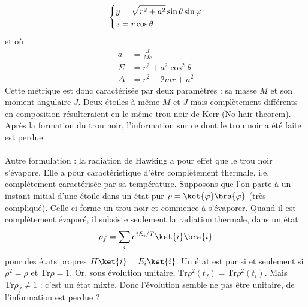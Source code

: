 \begin{enumerate}
\begin{equation}
\begin{dcases}
            y = \sqrt{r^2 +a^2} \sin \theta \sin \varphi \\
            z = r \cos\theta
        \end{dcases}
    \end{equation}
    et où
    \begin{align}
        a &= \frac{J}{Mc}\\
        \Sigma &= r^2 + a^2 \cos^2 \theta\\
        \Delta &= r^2 - 2m r + a^2
    \end{align}
    Cette métrique est donc caractérisée par deux paramètres : sa masse $M$ et son moment angulaire $J$. Deux étoiles à même $M$ et $J$ mais complètement différents en composition résulteraient en le même trou noir de Kerr (No hair theorem). \\
    Après la formation du trou noir, l'information sur ce dont le trou noir a été faite est perdue.\\
    \\
    Autre formulation : la radiation de Hawking a pour effet que le trou noir s'évapore. Elle a pour caractéristique d'être complètement thermale, i.e. complètement caractérisée par sa température. Supposons que l'on parte à un instant initial d'une étoile dans un état pur $\rho = \ket{\varphi} \bra{\varphi}$ (très compliqué). Celle-ci forme un trou noir et commence à s'évaporer. Quand il est complètement évaporé, il subsiste seulement la radiation thermale, dans un état
    \begin{equation}
        \rho_f = \sum_i e^{iE_i/T} \ket{i}\bra{i} 
    \end{equation}
    pour des états propres  $H \ket{i} = E_i \ket{i}$. Un état est pur si et seulement si $\rho^2 = \rho$ et $\mathrm{Tr} \rho = 1$. Or, sous évolution unitaire, $\mathrm{Tr} \rho^2 (t_f) = \mathrm{Tr} \rho^2(t_i)$. Mais $\mathrm{Tr} \rho_f \neq 1$ : c'est un état mixte. Donc l'évolution semble ne pas être unitaire, de l'information est perdue ?
\end{enumerate}
